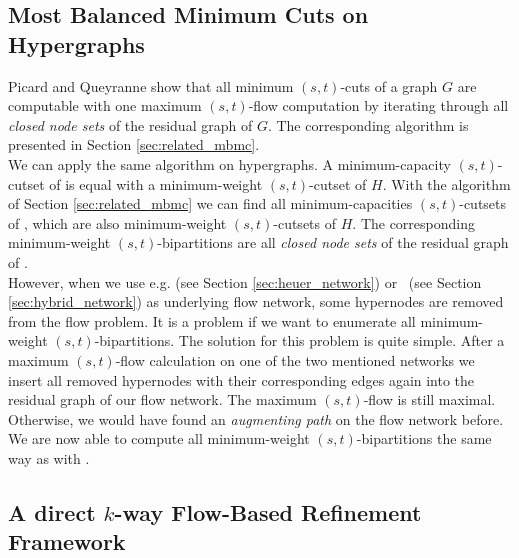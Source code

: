 \subsection{Most Balanced Minimum Cuts on Hypergraphs}
\label{sec:mbmc_hypergraphs}

Picard and Queyranne \cite{picard1980structure} show that all minimum $(s,t)$-cuts 
of a graph $G$ are computable with one maximum $(s,t)$-flow computation by 
iterating through all \emph{closed node sets} of the residual graph of $G$. 
The corresponding algorithm is presented in Section \ref{sec:related_mbmc}. \\
We can apply the same algorithm on hypergraphs. A minimum-capacity $(s,t)$-cutset of 
is equal with a minimum-weight $(s,t)$-cutset of $H$. With the algorithm
of Section \ref{sec:related_mbmc} we can find all minimum-capacities
$(s,t)$-cutsets of , which are also minimum-weight $(s,t)$-cutsets
of $H$. The corresponding minimum-weight $(s,t)$-bipartitions are all
\emph{closed node sets} of the residual graph of . \\
However, when we use e.g.  (see Section \ref{sec:heuer_network})
or \ShortHybrid~(see Section \ref{sec:hybrid_network}) as underlying flow network,
some hypernodes are removed from the flow problem. It is a problem if we want to
enumerate all minimum-weight $(s,t)$-bipartitions. The solution for 
this problem is quite simple. After a maximum $(s,t)$-flow calculation
on one of the two mentioned networks we insert all removed hypernodes with
their corresponding edges again into the residual graph of our flow network.
The maximum $(s,t)$-flow is still maximal. Otherwise, we would have found an \emph{augmenting
path} on the flow network before. We are now able to compute all minimum-weight
$(s,t)$-bipartitions the same way as with .

\subsection{A direct $k$-way Flow-Based Refinement Framework}
\label{sec:flow_local_search_hypergraph}

